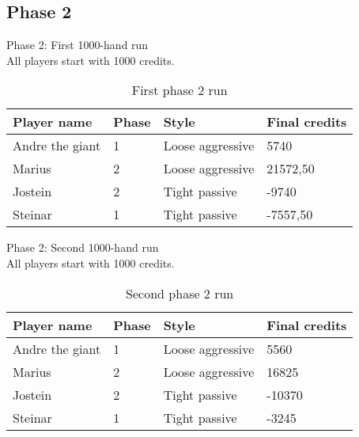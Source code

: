 \documentclass[a4paper, 12pt]{article}
\begin{document}
\subsection{Phase 2}
\begin{center}
	{ \Large Phase 2: First 1000-hand run } \\
	All players start with 1000 credits.
\end{center}

\begin{table}[H]
	\begin{center}
		\begin{tabular}{|l|l|l| p{6cm} |}
		\hline
		\textbf{Player name} & \textbf{Phase} & \textbf{Style} & \textbf{Final credits} \\
		\hline
		Andre the giant & 1 & Loose aggressive & 5740 \\
		\hline
		Marius & 2 & Loose aggressive & 21572,50 \\
		\hline
		Jostein & 2 & Tight passive & -9740 \\
		\hline
		Steinar & 1 & Tight passive & -7557,50 \\
		\hline
		\end{tabular}
	\end{center}
	\caption{First phase 2 run}
\end{table}

\begin{center}
	{ \Large Phase 2: Second 1000-hand run } \\
	All players start with 1000 credits.
\end{center}

\begin{table}[H]
	\begin{center}
		\begin{tabular}{|l|l|l| p{6cm} |}
		\hline
		\textbf{Player name} & \textbf{Phase} & \textbf{Style} & \textbf{Final credits} \\
		\hline
		Andre the giant & 1 & Loose aggressive & 5560 \\
		\hline
		Marius & 2 & Loose aggressive & 16825 \\
		\hline
		Jostein & 2 & Tight passive & -10370 \\
		\hline
		Steinar & 1 & Tight passive & -3245 \\
		\hline
		\end{tabular}
	\end{center}
	\caption{Second phase 2 run}
\end{table}
\end{document}
